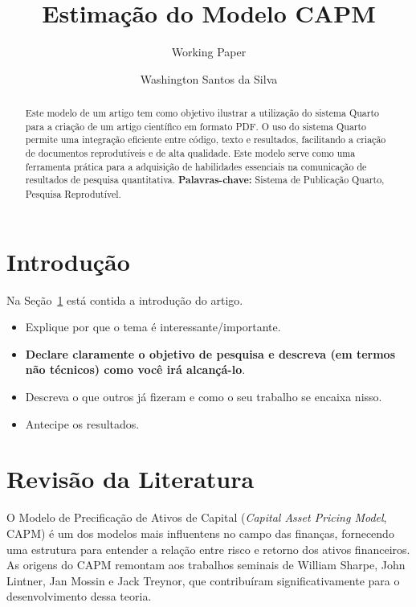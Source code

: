\documentclass[
  12pt,
  a4paperpaper,
]{article}
\title{Estimação do Modelo CAPM}
\subtitle{Working Paper}
\author{Washington Santos da Silva}
\date{}
\begin{document}
\maketitle
\begin{abstract}
Este modelo de um artigo tem como objetivo ilustrar a utilização do
sistema Quarto para a criação de um artigo científico em formato PDF. O
uso do sistema Quarto permite uma integração eficiente entre código,
texto e resultados, facilitando a criação de documentos reprodutíveis e
de alta qualidade. Este modelo serve como uma ferramenta prática para a
adquisição de habilidades essenciais na comunicação de resultados de
pesquisa quantitativa. \linebreak \textbf{Palavras-chave:} Sistema de
Publicação Quarto, Pesquisa Reprodutível.
\end{abstract}


\section{Introdução}\label{sec-intro}

Na Seção~\ref{sec-intro} está contida a introdução do artigo.

\begin{itemize}
\item
  Explique por que o tema é interessante/importante.
\item
  \textbf{Declare claramente o objetivo de pesquisa e descreva (em
  termos não técnicos) como você irá alcançá-lo}.
\item
  Descreva o que outros já fizeram e como o seu trabalho se encaixa
  nisso.
\item
  Antecipe os resultados.
\end{itemize}

\section{Revisão da Literatura}\label{sec-revlit}

O Modelo de Precificação de Ativos de Capital (\emph{Capital Asset
Pricing Model}, CAPM) é um dos modelos mais influentens no campo das
finanças, fornecendo uma estrutura para entender a relação entre risco e
retorno dos ativos financeiros. As origens do CAPM remontam aos
trabalhos seminais de William Sharpe, John Lintner, Jan Mossin e Jack
Treynor, que contribuíram significativamente para o desenvolvimento
dessa teoria.
\end{document}
